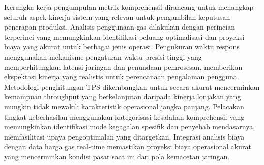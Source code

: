 Kerangka kerja pengumpulan metrik komprehensif dirancang untuk menangkap
seluruh aspek kinerja sistem yang relevan untuk pengambilan keputusan penerapan
produksi. Analisis penggunaan gas dilakukan dengan perincian terperinci yang
memungkinkan identifikasi peluang optimalisasi dan proyeksi biaya yang akurat
untuk berbagai jenis operasi. Pengukuran waktu respons menggunakan mekanisme
pengaturan waktu presisi tinggi yang memperhitungkan latensi jaringan dan
penundaan pemrosesan, memberikan ekspektasi kinerja yang realistis untuk
perencanaan pengalaman pengguna. Metodologi penghitungan TPS dikembangkan untuk
secara akurat mencerminkan kemampuan throughput yang berkelanjutan daripada
kinerja lonjakan yang mungkin tidak mewakili karakteristik operasional jangka
panjang. Pelacakan tingkat keberhasilan menggunakan kategorisasi kesalahan
komprehensif yang memungkinkan identifikasi mode kegagalan spesifik dan
penyebab mendasarnya, memfasilitasi upaya pengoptimalan yang ditargetkan.
Integrasi analisis biaya dengan data harga gas real-time memastikan proyeksi
biaya operasional akurat yang mencerminkan kondisi pasar saat ini dan pola
kemacetan jaringan.